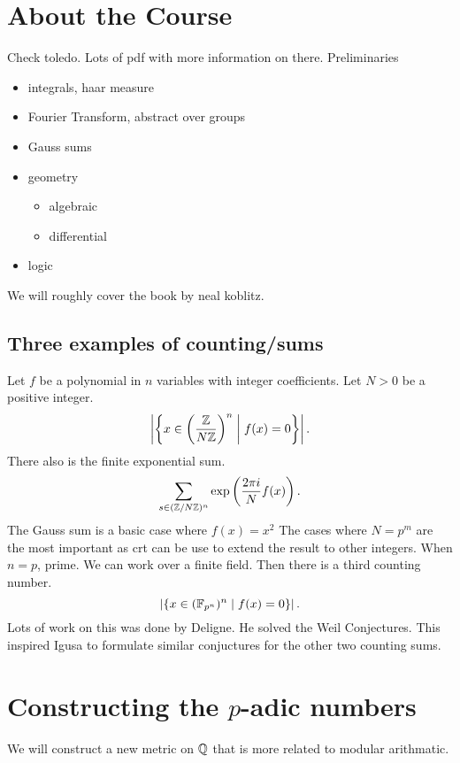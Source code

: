 
\setcounter{chapter}{-1}
\chapter{About the Course} \label{chap:about_the_course}
Check toledo. Lots of pdf with more information on there.
Preliminaries
\begin{itemize}
	\item integrals, haar measure
	\item Fourier Transform, abstract over groups
	\item Gauss sums
	\item geometry
		\begin{itemize}
			\item algebraic
			\item differential
		\end{itemize}
	\item logic
\end{itemize}
We will roughly cover the book by neal koblitz.
\section{Three examples of counting/sums} \label{sec:three_examples_of_counting/sums}
\begin{example}
	Let  $f$ be a polynomial in $n$ variables with integer coefficients. 
	Let $N > 0$ be a positive integer.
	\[
		\left| \left\{ x \in \left( \frac{\mathbb{Z}}{N\mathbb{Z}} \right) ^{n} \; \middle | \; f(x) = 0 \right\}   \right|
	.\] 
	There also is the finite exponential sum.
	\[
		\sum_{s \in (\mathbb{Z} / N \mathbb{Z})^{n}} \exp\left( \frac{2\pi i}{N} f(x) \right) 
	.\] 
	The Gauss sum is a basic case where $f(x) = x^2$
	The cases where $N = p^{m}$ are the most important as crt can be use to extend the result to other integers.
	When $n  = p$, prime. We can work over a finite field. Then there is a third counting number.
	 \[
		 \left| \left\{ x \in (\mathbb{F}_{p^{n}})^n \; \middle | \; f(x) = 0 \right\}  \right|
	.\] 
	Lots of work on this was done by Deligne. He solved the Weil Conjectures.
	This inspired Igusa to formulate similar conjuctures for the other two counting sums.

\end{example}

\chapter{Constructing the $p$-adic numbers} \label{chap:constructing_the_$p$-adic_numbers}
We will construct a new metric on $\mathbb{Q}$ that is more related to modular arithmatic.

